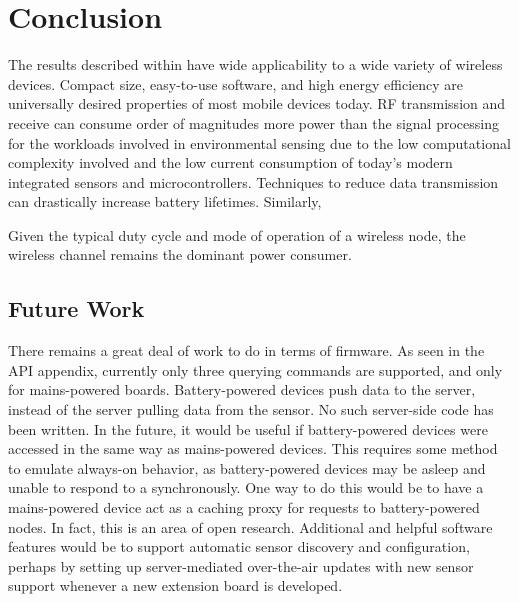 \chapter{Conclusion}

The results described within have wide applicability to a wide variety of wireless devices. Compact size, easy-to-use software, and high energy efficiency are universally desired properties of most mobile devices today. RF transmission and receive can consume order of magnitudes more power than the signal processing for the workloads involved in environmental sensing due to the low computational complexity involved and the low current consumption of today's modern integrated sensors and microcontrollers. Techniques to reduce data transmission can drastically increase battery lifetimes. Similarly, 

Given the typical duty cycle and mode of operation of a wireless node, the wireless channel remains the dominant power consumer. 

\section{Future Work}

There remains a great deal of work to do in terms of firmware. As seen in the API appendix, currently only three querying commands are supported, and only for mains-powered boards. Battery-powered devices push data to the server, instead of the server pulling data from the sensor. No such server-side code has been written. In the future, it would be useful if battery-powered devices were accessed in the same way as mains-powered devices. This requires some method to emulate always-on behavior, as battery-powered devices may be asleep and unable to respond to a synchronously. One way to do this would be to have a mains-powered device act as a caching proxy for requests to battery-powered nodes. In fact, this is an area of open research\cite{Lu2011}. Additional and helpful software features would be to support automatic sensor discovery and configuration, perhaps by setting up server-mediated over-the-air updates with new sensor support whenever a new extension board is developed.